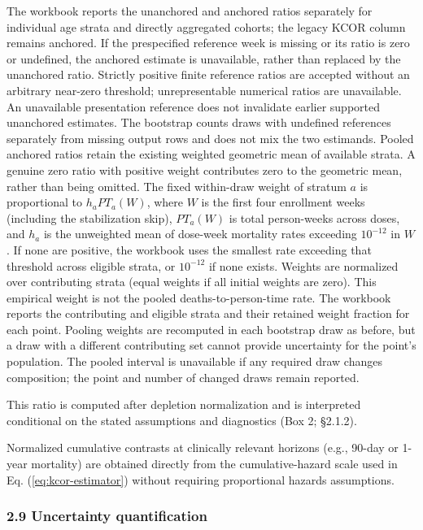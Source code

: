 \documentclass[
]{article}
\newcounter{none} %
\begin{document}
The workbook reports the unanchored and anchored ratios separately for individual age strata and directly aggregated cohorts; the legacy KCOR column remains anchored. If the prespecified reference week is missing or its ratio is zero or undefined, the anchored estimate is unavailable, rather than replaced by the unanchored ratio. Strictly positive finite reference ratios are accepted without an arbitrary near-zero threshold; unrepresentable numerical ratios are unavailable. An unavailable presentation reference does not invalidate earlier supported unanchored estimates. The bootstrap counts draws with undefined references separately from missing output rows and does not mix the two estimands. Pooled anchored ratios retain the existing weighted geometric mean of available strata. A genuine zero ratio with positive weight contributes zero to the geometric mean, rather than being omitted. The fixed within-draw weight of stratum \(a\) is proportional to \(h_a PT_a(W)\), where \(W\) is the first four enrollment weeks (including the stabilization skip), \(PT_a(W)\) is total person-weeks across doses, and \(h_a\) is the unweighted mean of dose-week mortality rates exceeding \(10^{-12}\) in \(W\). If none are positive, the workbook uses the smallest rate exceeding that threshold across eligible strata, or \(10^{-12}\) if none exists. Weights are normalized over contributing strata (equal weights if all initial weights are zero). This empirical weight is not the pooled deaths-to-person-time rate. The workbook reports the contributing and eligible strata and their retained weight fraction for each point. Pooling weights are recomputed in each bootstrap draw as before, but a draw with a different contributing set cannot provide uncertainty for the point's population. The pooled interval is unavailable if any required draw changes composition; the point and number of changed draws remain reported.

This ratio is computed after depletion normalization and is interpreted conditional on the stated assumptions and diagnostics (Box 2; §2.1.2).

Normalized cumulative contrasts at clinically relevant horizons (e.g., 90-day or 1-year mortality) are obtained directly from the cumulative-hazard scale used in Eq. (\ref{eq:kcor-estimator}) without requiring proportional hazards assumptions.

\subsubsection{2.9 Uncertainty quantification}\label{uncertainty-quantification}
\end{document}

